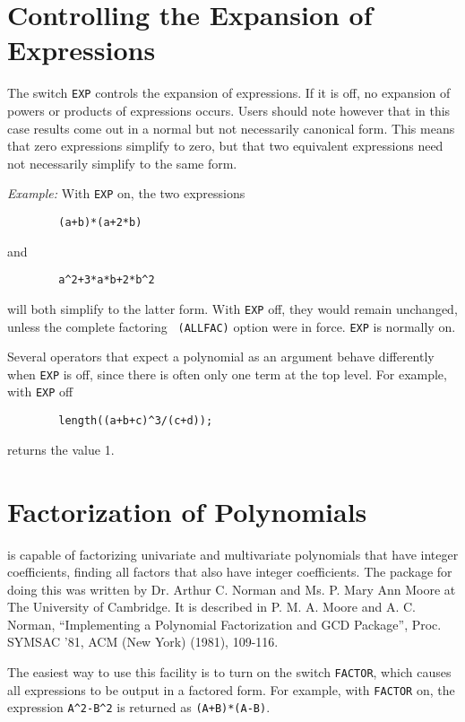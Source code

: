 \section{Controlling the Expansion of Expressions}

The switch {\tt EXP} controls the expansion of expressions.  If
it is off, no expansion of powers or products of expressions occurs.
Users should note however that in this case results come out in a normal
but not necessarily canonical form.  This means that zero expressions
simplify to zero, but that two equivalent expressions need not necessarily
simplify to the same form.

{\it Example:} With {\tt EXP} on, the two expressions
\begin{verbatim}
        (a+b)*(a+2*b)
\end{verbatim}
and
\begin{verbatim}
        a^2+3*a*b+2*b^2
\end{verbatim}
will both simplify to the latter form.  With {\tt EXP}
off, they would remain unchanged, unless the complete factoring {\tt
(ALLFAC)} option were in force. {\tt EXP} is normally on.

Several operators that expect a polynomial as an argument behave
differently when {\tt EXP} is off, since there is often only one term at
the top level.  For example, with {\tt EXP} off
\begin{verbatim}
        length((a+b+c)^3/(c+d));
\end{verbatim}
returns the value 1.

\section{Factorization of Polynomials}
{\REDUCE} is capable of factorizing univariate and multivariate polynomials
that have integer coefficients, finding all factors that also have integer
coefficients. The package for doing this was written by Dr. Arthur C.
Norman and Ms. P. Mary Ann Moore at The University of Cambridge. It is
described in P. M. A. Moore and A. C. Norman, ``Implementing a Polynomial
Factorization and GCD Package'', Proc. SYMSAC '81, ACM (New York) (1981),
109-116.

The easiest way to use this facility is to turn on the switch
{\tt FACTOR}, which causes all expressions to be output in
a factored form.  For example, with {\tt FACTOR} on, the expression
{\tt A\verb|^|2-B\verb|^|2} is returned as {\tt (A+B)*(A-B)}.

